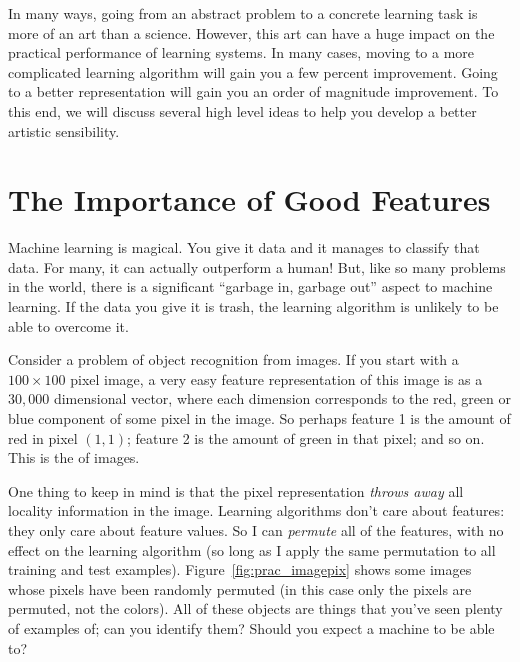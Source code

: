 In many ways, going from an abstract problem to a concrete learning
task is more of an art than a science.  However, this art can have a
huge impact on the practical performance of learning systems.  In many
cases, moving to a more complicated learning algorithm will gain you a
few percent improvement.  Going to a better representation will gain
you an order of magnitude improvement.  To this end, we will discuss
several high level ideas to help you develop a better artistic
sensibility.

\section{The Importance of Good Features}

Machine learning is magical.  You give it data and it manages to
classify that data.  For many, it can actually outperform a human!
But, like so many problems in the world, there is a significant
``garbage in, garbage out'' aspect to machine learning.  If the data
you give it is trash, the learning algorithm is unlikely to be able to
overcome it.


Consider a problem of object recognition from images.  If you start
with a $100 \times 100$ pixel image, a very easy feature
representation of this image is as a $30,000$ dimensional vector,
where each dimension corresponds to the red, green or blue component
of some pixel in the image.  So perhaps feature 1 is the amount of red
in pixel $(1,1)$; feature 2 is the amount of green in that pixel; and
so on.  This is the  of images.

One thing to keep in mind is that the pixel representation
\emph{throws away} all locality information in the image.  Learning
algorithms don't care about features: they only care about feature
values.  So I can \emph{permute} all of the features, with no effect
on the learning algorithm (so long as I apply the same permutation to
all training and test examples).  Figure~\ref{fig:prac_imagepix} shows
some images whose pixels have been randomly permuted (in this case only
the pixels are permuted, not the colors).  All of these objects are
things that you've seen plenty of examples of; can you identify them?
Should you expect a machine to be able to?


